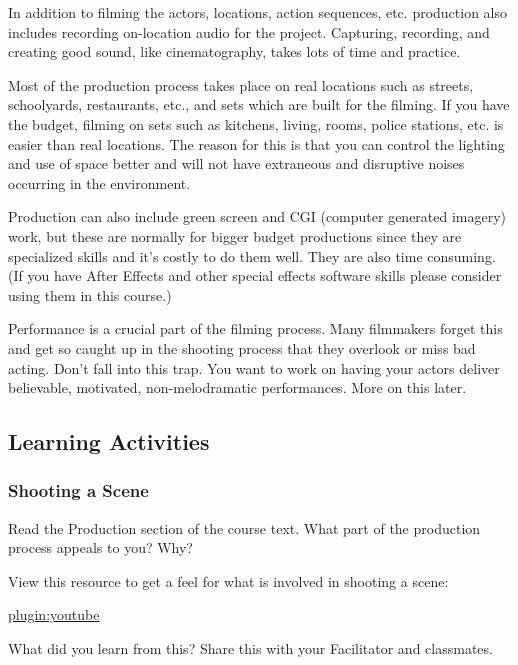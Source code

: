 \documentclass[
]{book}
\begin{document}
In addition to filming the actors, locations, action sequences, etc. production also includes recording on-location audio for the project. Capturing, recording, and creating good sound, like cinematography, takes lots of time and practice.

Most of the production process takes place on real locations such as streets, schoolyards, restaurants, etc., and sets which are built for the filming. If you have the budget, filming on sets such as kitchens, living, rooms, police stations, etc. is easier than real locations. The reason for this is that you can control the lighting and use of space better and will not have extraneous and disruptive noises occurring in the environment.

Production can also include green screen and CGI (computer generated imagery) work, but these are normally for bigger budget productions since they are specialized skills and it's costly to do them well. They are also time consuming. (If you have After Effects and other special effects software skills please consider using them in this course.)

Performance is a crucial part of the filming process. Many filmmakers forget this and get so caught up in the shooting process that they overlook or miss bad acting. Don't fall into this trap. You want to work on having your actors deliver believable, motivated, non-melodramatic performances. More on this later.

\hypertarget{learning-activities-7}{%
\subsection*{Learning Activities}\label{learning-activities-7}}

\begin{reflect}
\hypertarget{shooting-a-scene}{%
\subsubsection*{Shooting a Scene}\label{shooting-a-scene}}

Read the Production section of the course text.
What part of the production process appeals to you? Why?

View this resource to get a feel for what is involved in shooting a scene:

\href{https://www.youtube.com/watch?v=y9_LW5H2EC4}{plugin:youtube}

What did you learn from this? Share this with your Facilitator and classmates.
\end{reflect}
\end{document}
